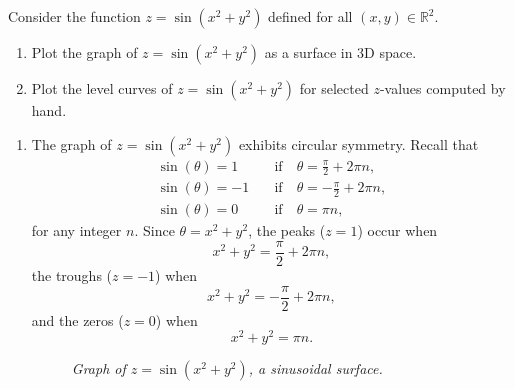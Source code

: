 \exampleline
\begin{example}
Consider the function \( z = \sin(x^2 + y^2) \) defined for all \( (x, y) \in \mathbb{R}^2 \).

\begin{enumerate}
    \item Plot the graph of \( z = \sin(x^2 + y^2) \) as a surface in 3D space.
    \item Plot the level curves of \( z = \sin(x^2 + y^2) \) for selected \( z \)-values computed by hand.
\end{enumerate}

\begin{solution}
\begin{enumerate}
    \item The graph of \( z = \sin(x^2 + y^2) \) exhibits circular symmetry. Recall that
    \[
    \begin{aligned}
    \sin(\theta) = 1 &\quad \text{if} \quad \theta = \frac{\pi}{2}+2\pi n,\\[6pt]
    \sin(\theta) = -1 &\quad \text{if} \quad \theta = -\frac{\pi}{2}+2\pi n,\\[6pt]
    \sin(\theta) = 0 &\quad \text{if} \quad \theta = \pi n,
    \end{aligned}
    \]
    for any integer \( n \). Since \( \theta = x^2+y^2 \), the peaks (\( z=1 \)) occur when
    \[
    x^2+y^2 = \frac{\pi}{2}+2\pi n,
    \]
    the troughs (\( z=-1 \)) when
    \[
    x^2+y^2 = -\frac{\pi}{2}+2\pi n,
    \]
    and the zeros (\( z=0 \)) when
    \[
    x^2+y^2 = \pi n.
    \]

    \begin{figure}[H]
        \centering
        \caption{\textit{Graph of \( z = \sin(x^2+y^2) \), a sinusoidal surface.}}
        \label{fig:surface_sin_x2y2}
    \end{figure}


\end{enumerate}
\end{solution}
\end{example}
